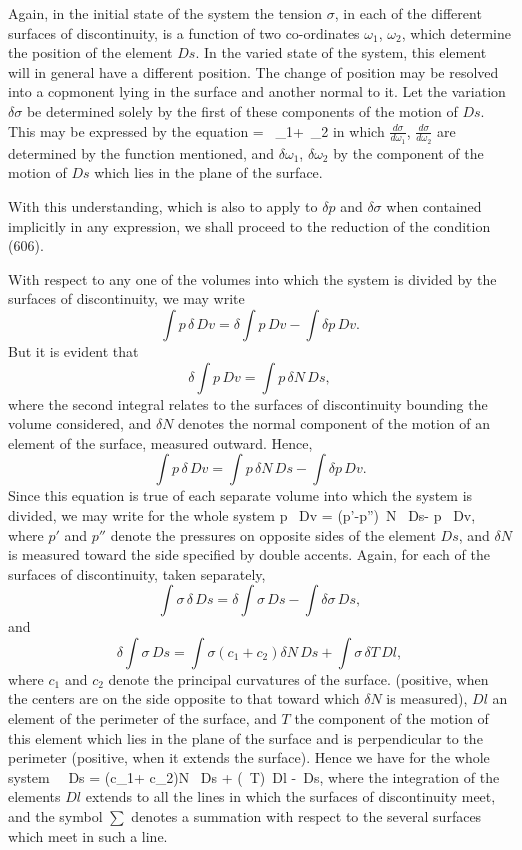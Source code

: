 \documentclass[12pt]{article}
\newcommand{\dd}{\delta}
\begin{document}
Again, in the initial state of the system the tension $\sigma$, in each of the different surfaces of discontinuity, is a function of two co-ordinates $\omega_1$, $\omega_2$, which determine the position of the element $Ds$. In the varied state of the system, this element will in general have a different position. The change of position may be resolved into a copmonent lying in the surface and another normal to it. Let the variation $\dd \sigma$ be determined solely by the first of these components of the motion of $Ds$. This may be expressed by the equation
\eqs \dd \sigma= \, \dd \omega_1+\, \dd \omega_2   \label{608} \eqe
in which $\frac{d\sigma}{d\omega_1}$, $\frac{d\sigma}{d\omega_2}$ are determined by the function mentioned, and $\dd \omega_1$, $\dd \omega_2$ by the component of the motion of $Ds$ which lies in the plane of the surface.

With this understanding, which is also to apply to $\dd p$ and $\dd \sigma$ when contained implicitly in any expression, we shall proceed to the reduction of the condition (606).

With respect to any one of the volumes into which the system is divided by the surfaces of discontinuity, we may write
$$ \int p \, \dd \, Dv = \dd \int p \, Dv- \int \dd p \, Dv. $$
But it is evident that
$$ \dd \int p \, Dv = \int p \, \dd N \, Ds, $$
where the second integral relates to the surfaces of discontinuity bounding the volume considered, and $\dd N$ denotes the normal component of the motion of an element of the surface, measured outward. Hence,
$$ \int p \, \dd \, Dv = \int p \, \dd N \, Ds -\int \dd p \, Dv. $$
Since this equation is true of each separate volume into which the system is divided, we may write for the whole system
\eqs \int p \, \dd Dv = \int(p'-p'')\, \dd N \, Ds- \int \dd p \, Dv, \label{609} \eqe
where $p'$ and $p''$ denote the pressures on opposite sides of the element $Ds$, and $\dd N$ is measured toward the side specified by double accents. Again, for each of the surfaces of discontinuity, taken separately,
$$ \int \sigma \, \dd \, Ds =  \dd \int \sigma \, Ds-\int \dd \sigma \, Ds, $$
and
$$ \dd \int \sigma \, Ds = \int \sigma (c_1+ c_2)\dd N \, Ds+ \int \sigma  \, \dd T \, Dl, $$
where $c_1$ and $c_2$ denote the principal curvatures of the surface. (positive, when the centers are on the side opposite to that toward which $\dd N$ is measured), $Dl$ an element of the perimeter of the surface, and $T$ the component of the motion of this element which lies in the plane of the surface and is perpendicular to the perimeter (positive, when it extends the surface). Hence we have for the whole system
\eqs \int \sigma \, \dd \, Ds = \int \sigma (c_1+ c_2)\dd N \, Ds + \int \sum(\sigma\, \dd T)\, Dl -\int \dd \sigma \, Ds,  \label{610} \eqe 
where the integration of the elements $Dl$ extends to all the lines in which the surfaces of discontinuity meet, and the symbol $\sum$ denotes a summation with respect to the several surfaces which meet in such a line.
\end{document}
